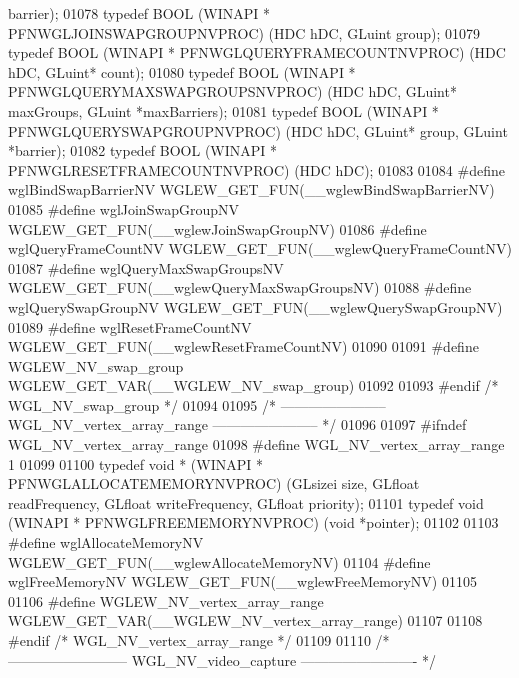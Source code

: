 \begin{DoxyCode}
      barrier);
01078 \textcolor{keyword}{typedef} BOOL (WINAPI * PFNWGLJOINSWAPGROUPNVPROC) (HDC hDC, GLuint group);
01079 \textcolor{keyword}{typedef} BOOL (WINAPI * PFNWGLQUERYFRAMECOUNTNVPROC) (HDC hDC, GLuint* count);
01080 \textcolor{keyword}{typedef} BOOL (WINAPI * PFNWGLQUERYMAXSWAPGROUPSNVPROC) (HDC hDC, GLuint* 
      maxGroups, GLuint *maxBarriers);
01081 \textcolor{keyword}{typedef} BOOL (WINAPI * PFNWGLQUERYSWAPGROUPNVPROC) (HDC hDC, GLuint* group, 
      GLuint *barrier);
01082 \textcolor{keyword}{typedef} BOOL (WINAPI * PFNWGLRESETFRAMECOUNTNVPROC) (HDC hDC);
01083 
01084 \textcolor{preprocessor}{#define wglBindSwapBarrierNV WGLEW\_GET\_FUN(\_\_wglewBindSwapBarrierNV)}
01085 \textcolor{preprocessor}{#define wglJoinSwapGroupNV WGLEW\_GET\_FUN(\_\_wglewJoinSwapGroupNV)}
01086 \textcolor{preprocessor}{#define wglQueryFrameCountNV WGLEW\_GET\_FUN(\_\_wglewQueryFrameCountNV)}
01087 \textcolor{preprocessor}{#define wglQueryMaxSwapGroupsNV WGLEW\_GET\_FUN(\_\_wglewQueryMaxSwapGroupsNV)}
01088 \textcolor{preprocessor}{#define wglQuerySwapGroupNV WGLEW\_GET\_FUN(\_\_wglewQuerySwapGroupNV)}
01089 \textcolor{preprocessor}{#define wglResetFrameCountNV WGLEW\_GET\_FUN(\_\_wglewResetFrameCountNV)}
01090 
01091 \textcolor{preprocessor}{#define WGLEW\_NV\_swap\_group WGLEW\_GET\_VAR(\_\_WGLEW\_NV\_swap\_group)}
01092 
01093 \textcolor{preprocessor}{#endif }\textcolor{comment}{/* WGL\_NV\_swap\_group */}\textcolor{preprocessor}{}
01094 
01095 \textcolor{comment}{/* ----------------------- WGL\_NV\_vertex\_array\_range ----------------------- */}
01096 
01097 \textcolor{preprocessor}{#ifndef WGL\_NV\_vertex\_array\_range}
01098 \textcolor{preprocessor}{#define WGL\_NV\_vertex\_array\_range 1}
01099 
01100 \textcolor{keyword}{typedef} \textcolor{keywordtype}{void} * (WINAPI * PFNWGLALLOCATEMEMORYNVPROC) (GLsizei size, GLfloat readFrequency, 
      GLfloat writeFrequency, GLfloat priority);
01101 \textcolor{keyword}{typedef} void (WINAPI * PFNWGLFREEMEMORYNVPROC) (\textcolor{keywordtype}{void} *pointer);
01102 
01103 \textcolor{preprocessor}{#define wglAllocateMemoryNV WGLEW\_GET\_FUN(\_\_wglewAllocateMemoryNV)}
01104 \textcolor{preprocessor}{#define wglFreeMemoryNV WGLEW\_GET\_FUN(\_\_wglewFreeMemoryNV)}
01105 
01106 \textcolor{preprocessor}{#define WGLEW\_NV\_vertex\_array\_range WGLEW\_GET\_VAR(\_\_WGLEW\_NV\_vertex\_array\_range)}
01107 
01108 \textcolor{preprocessor}{#endif }\textcolor{comment}{/* WGL\_NV\_vertex\_array\_range */}\textcolor{preprocessor}{}
01109 
01110 \textcolor{comment}{/* -------------------------- WGL\_NV\_video\_capture ------------------------- */}

\end{DoxyCode}
